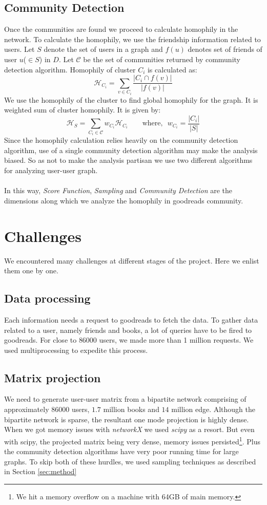 \documentclass[11pt]{article}
\begin{document}
\subsection{Community Detection}
Once the communities are found we proceed to calculate homophily in the network. To calculate the homophily, we use the friendship information related to users. Let $S$ denote the set of users in a graph and $f(u)$ denotes set of friends of user $u$($\in S$) in $D$. Let $\mathcal{C}$ be the set of communities returned by community detection algorithm. Homophily of cluster $C_i$ is calculated as:
\[
\mathcal{H}_{C_i} = \sum_{v \in C_i} \frac{|C_i \cap f(v)|}{|f(v)|}
\]
We use the homophily of the cluster to find global homophily for the graph. It is weighted sum of cluster homophily. It is given by:
\[
\mathcal{H}_{S} = \sum_{C_i \in \mathcal{C}} w_{C_i} \mathcal{H}_{C_i} ~~~~~~~~~\textrm{where,}~~~w_{C_i} = \frac{|C_i|}{|S|}
\]
Since the homophily calculation relies heavily on the community detection algorithm, use of a single community detection algorithm may make the analysis biased. So as not to make the analysis partisan we use two different algorithms for analyzing user-user graph.\\\\
In this way, {\it Score Function}, {\it Sampling} and {\it Community Detection} are the dimensions along which we analyze the homophily in goodreads community.

\section{Challenges}
We encountered many challenges at different stages of the project. Here we enlist them one by one.

\subsection{Data processing}
Each information needs a request to goodreads to fetch the data. To gather data related to a user, namely friends and books, a lot of queries have to be fired to goodreads. For close to $86000$ users, we made more than 1 million requests. We used multiprocessing to expedite this process.

\subsection{Matrix projection}
We need to generate user-user matrix from a bipartite network comprising of approximately $86000$ users, $1.7$ million books and $14$ million edge. Although the bipartite network is sparse, the resultant one mode projection is highly dense. When we got memory issues with {\it networkX}\cite{networkx} we used {\it scipy}\cite{scipy} as a resort. But even with scipy, the projected matrix being very dense, memory issues persisted\footnote{ We hit a memory overflow on a machine with 64GB of main memory.}. Plus the community detection algorithms have very poor running time for large graphs. To skip both of these hurdles, we used sampling techniques as described in Section \ref{sec:method}
\end{document}
